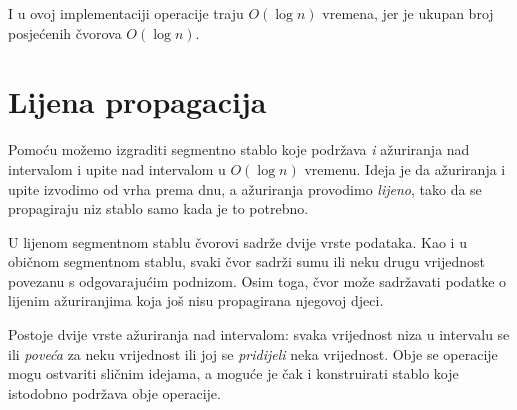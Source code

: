 \begin{center}
\end{center}

I u ovoj implementaciji
operacije traju $O(\log n)$ vremena,
jer je ukupan broj posjećenih čvorova $O(\log n)$.

\section{Lijena propagacija}


Pomoću  možemo izgraditi
segmentno stablo koje podržava \emph{i} ažuriranja nad intervalom
i upite nad intervalom u $O(\log n)$ vremenu.
Ideja je da ažuriranja i upite izvodimo
od vrha prema dnu, a ažuriranja provodimo
\emph{lijeno}, tako da se propagiraju
niz stablo samo kada je to potrebno.

U lijenom segmentnom stablu čvorovi sadrže dvije vrste
podataka.
Kao i u običnom segmentnom stablu,
svaki čvor sadrži sumu ili neku drugu vrijednost
povezanu s odgovarajućim podnizom.
Osim toga, čvor može sadržavati podatke
o lijenim ažuriranjima koja još nisu
propagirana njegovoj djeci.

Postoje dvije vrste ažuriranja nad intervalom:
svaka vrijednost niza u intervalu se ili
\emph{poveća} za neku vrijednost
ili joj se \emph{pridijeli} neka vrijednost.
Obje se operacije mogu ostvariti
sličnim idejama, a moguće je čak i konstruirati
stablo koje istodobno podržava obje operacije.

